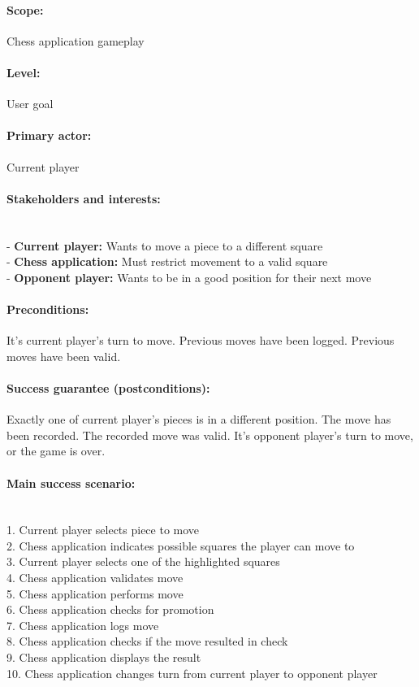 \documentclass{article}
\begin{document}
\paragraph{Scope:} Chess application gameplay

\paragraph{Level:} User goal

\paragraph{Primary actor:} Current player

\paragraph{Stakeholders and interests:}\mbox{}\\
- \textbf{Current player:} Wants to move a piece to a different square\\
- \textbf{Chess application:} Must restrict movement to a valid square\\
- \textbf{Opponent player:} Wants to be in a good position for their next move

\paragraph{Preconditions:} It's current player's turn to move. Previous moves have been logged. Previous moves have been valid.

\paragraph{Success guarantee (postconditions):} Exactly one of current player's pieces is in a different position. The move has been recorded. The recorded move was valid. It's opponent player's turn to move, or the game is over.
\paragraph{Main success scenario:}\mbox{}\\
1. Current player selects piece to move\\
2. Chess application indicates possible squares the player can move to\\
3. Current player selects one of the highlighted squares\\
4. Chess application validates move\\
5. Chess application performs move\\
6. Chess application checks for promotion\\
7. Chess application logs move\\
8. Chess application checks if the move resulted in check\\
9. Chess application displays the result\\
10. Chess application changes turn from current player to opponent player
\end{document}

